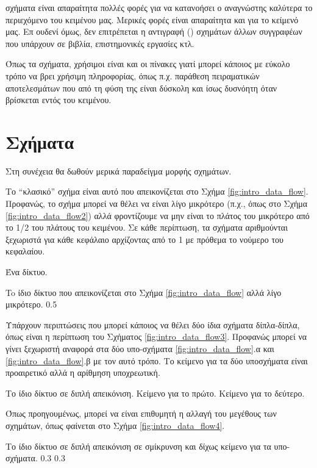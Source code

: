 σχήματα είναι απαραίτητα πολλές φορές για να κατανοήσει
ο αναγνώστης καλύτερα το περιεχόμενο του κειμένου μας.
Μερικές φορές είναι απαραίτητα και για το κείμενό μας.
Επ ουδενί όμως, δεν επιτρέπεται η αντιγραφή ()
σχημάτων άλλων συγγραφέων που υπάρχουν σε βιβλία,
επιστημονικές εργασίες κτλ. 

Όπως τα σχήματα, χρήσιμοι είναι και οι πίνακες 
γιατί μπορεί κάποιος με εύκολο τρόπο να βρει χρήσιμη πληροφορίας,
όπως π.χ. παράθεση πειραματικών αποτελεσμάτων που από τη 
φύση της είναι δύσκολη και ίσως δυσνόητη όταν 
βρίσκεται εντός του κειμένου.

\section{Σχήματα}

Στη συνέχεια θα δωθούν μερικά παραδείγμα μορφής σχημάτων.

Το ``κλασικό'' σχήμα είναι αυτό που
απεικονίζεται στο Σχήμα \ref{fig:intro_data_flow}.
Προφανώς, το σχήμα μπορεί να θέλει να είναι λίγο μικρότερο
(π.χ., όπως στο Σχήμα \ref{fig:intro_data_flow2})
αλλά φροντίζουμε να μην είναι το πλάτος του μικρότερο από
το 1/2 του πλάτους του κειμένου. Σε κάθε περίπτωση, 
τα σχήματα αριθμούνται ξεχωριστά για κάθε κεφάλαιο
αρχίζοντας από το 1 με πρόθεμα το νούμερο του κεφαλαίου.

{Ένα δίκτυο.}

{To ίδιο δίκτυο  που
απεικονίζεται στο Σχήμα \ref{fig:intro_data_flow}
αλλά λίγο μικρότερο.
}
{0.5}




Υπάρχουν περιπτώσεις που μπορεί κάποιος να
θέλει δύο ίδια σχήματα δίπλα-δίπλα,
όπως είναι η περίπτωση του Σχήματος \ref{fig:intro_data_flow3}.
Προφανώς μπορεί να γίνει ξεχωριστή αναφορά στα
δύο υπο-σχήματα \ref{fig:intro_data_flow}.α και \ref{fig:intro_data_flow}.β
με τον αυτό τρόπο.
Το κείμενο για τα δύο υποσχήματα είναι προαιρετικό αλλά η αρίθμηση υποχρεωτική.

{Το ίδιο δίκτυο σε διπλή απεικόνιση.}
{Κείμενο για το πρώτο.}
{Κείμενο για το δεύτερο.}

Όπως προηγουμένως, μπορεί να είναι επιθυμητή
η αλλαγή του μεγέθους των σχημάτων, όπως φαίνεται στο 
Σχήμα \ref{fig:intro_data_flow4}.


{Το ίδιο δίκτυο σε διπλή απεικόνιση σε σμίκρυνση
και δίχως κείμενο για τα υπο-σχήματα.}
{}
{}
{0.3}
{0.3}


